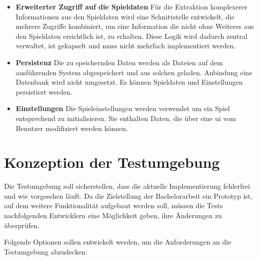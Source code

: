 \documentclass[
							a4paper, 
							11pt, 
							openany, 
							liststotoc,
							parskip=half, 
   							headings=normal
						]{scrreprt}
\begin{document}
{\begin{itemize}
	\item \textbf{Erweiterter Zugriff auf die Spieldaten}\newline
Für die Extraktion komplexerer Informationen aus den Spieldaten wird eine Schnittstelle entwickelt, die mehrere Zugriffe kombiniert, um eine Information die nicht ohne Weiteres aus den Spieldaten ersichtlich ist, zu erhalten. Diese Logik wird dadurch zentral verwaltet, ist gekapselt und muss nicht mehrfach implementiert werden.
	\item \textbf{Persistenz}\newline
Die zu speichernden Daten werden als Dateien auf dem ausführenden System abgespeichert und aus solchen geladen. Anbindung eine Datenbank wird nicht umgesetzt. Es können Spieldaten und Einstellungen persistiert werden.
	\item \textbf{Einstellungen}\newline
Die Spieleinstellungen werden verwendet um ein Spiel entsprechend zu initialisieren. Sie enthalten Daten, die über eine \acs{ui} vom Benutzer modifiziert werden können.
\end{itemize}

\section{Konzeption der Testumgebung}
\label{se:einleitung_problem_testen}
Die Testumgebung soll sicherstellen, dass die aktuelle Implementierung fehlerfrei und wie vorgesehen läuft. Da die Zielstellung der Bachelorarbeit ein Prototyp ist, auf dem weitere Funktionalität aufgebaut werden soll, müssen die Tests nachfolgenden Entwicklern eine Möglichkeit geben, ihre Änderungen zu überprüfen.

Folgende Optionen sollen entwickelt werden, um die Anforderungen an die Testumgebung abzudecken:

}
\end{document}
